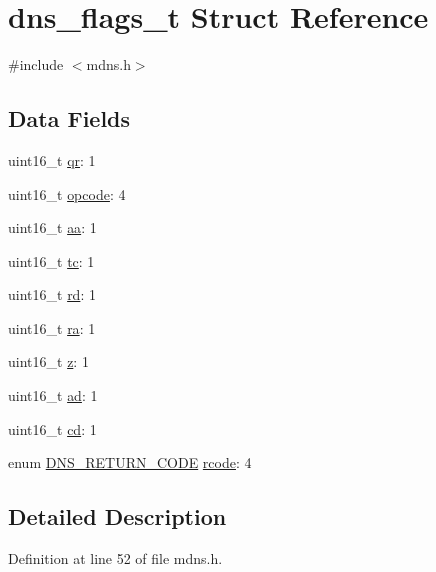 \hypertarget{structdns__flags__t}{\section{dns\-\_\-flags\-\_\-t Struct Reference}
\label{structdns__flags__t}
}


{\ttfamily \#include $<$mdns.\-h$>$}

\subsection*{Data Fields}
\begin{DoxyCompactItemize}
\item 
uint16\-\_\-t \hyperlink{structdns__flags__t_ab7bfbea7d3eaf848ba29a8c1bbabbce3}{qr}\-: 1
\item 
uint16\-\_\-t \hyperlink{structdns__flags__t_aeb39438c0aa5ad494c96060b00351545}{opcode}\-: 4
\item 
uint16\-\_\-t \hyperlink{structdns__flags__t_a303aecc788f498a5c21fe1d5c2ddf617}{aa}\-: 1
\item 
uint16\-\_\-t \hyperlink{structdns__flags__t_a3dbe362279aee5fe3f0012b7f99fc8d2}{tc}\-: 1
\item 
uint16\-\_\-t \hyperlink{structdns__flags__t_aa6e6728bc7052b66419fa595fb8ea9ec}{rd}\-: 1
\item 
uint16\-\_\-t \hyperlink{structdns__flags__t_a9e6a307a79261870745296b01245eadb}{ra}\-: 1
\item 
uint16\-\_\-t \hyperlink{structdns__flags__t_a72adab9ed2ad760c11fba6030575e111}{z}\-: 1
\item 
uint16\-\_\-t \hyperlink{structdns__flags__t_ae44bc0444c0f86c5369f02f61a1f083a}{ad}\-: 1
\item 
uint16\-\_\-t \hyperlink{structdns__flags__t_aaf00d4c86279d8c9bce3982afeecb7d5}{cd}\-: 1
\item 
enum \hyperlink{mdns_8h_af9eceef222a0a264c35b898ae133e2a2}{D\-N\-S\-\_\-\-R\-E\-T\-U\-R\-N\-\_\-\-C\-O\-D\-E} \hyperlink{structdns__flags__t_a22b83308deec29b7742059ecf8ed1f5a}{rcode}\-: 4
\end{DoxyCompactItemize}


\subsection{Detailed Description}


Definition at line 52 of file mdns.\-h.



